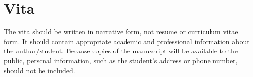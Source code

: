 \chapter*{Vita} \label{ch:vita}

The vita should be written in narrative form, not resume or curriculum vitae form.
It should contain appropriate academic and professional information about the
author/student. Because copies of the manuscript will be available to the public,
personal information, such as the student's address or phone number, should not
be included.

